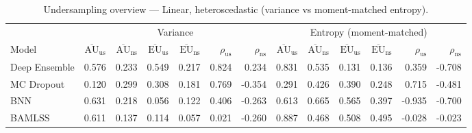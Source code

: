 
\begin{table}[htbp]
\centering
\small
\caption{Undersampling overview --- Linear, heteroscedastic (variance vs moment-matched entropy).}
\begin{tabular}{l*{12}{r}}
\toprule
 & \multicolumn{6}{c}{Variance} & \multicolumn{6}{c}{Entropy (moment-matched)} \\
\cmidrule(lr){2-7}\cmidrule(lr){8-13}
Model & $\overline{\mathrm{AU}}_{\mathrm{us}}$ & $\overline{\mathrm{AU}}_{\mathrm{ns}}$ & $\overline{\mathrm{EU}}_{\mathrm{us}}$ & $\overline{\mathrm{EU}}_{\mathrm{ns}}$ & $\rho_{\mathrm{us}}$ & $\rho_{\mathrm{ns}}$ & $\overline{\mathrm{AU}}_{\mathrm{us}}$ & $\overline{\mathrm{AU}}_{\mathrm{ns}}$ & $\overline{\mathrm{EU}}_{\mathrm{us}}$ & $\overline{\mathrm{EU}}_{\mathrm{ns}}$ & $\rho_{\mathrm{us}}$ & $\rho_{\mathrm{ns}}$ \\
\midrule
Deep Ensemble & 0.576 & 0.233 & 0.549 & 0.217 & 0.824 & 0.234 & 0.831 & 0.535 & 0.131 & 0.136 & 0.359 & -0.708 \\
MC Dropout & 0.120 & 0.299 & 0.308 & 0.181 & 0.769 & -0.354 & 0.291 & 0.426 & 0.390 & 0.248 & 0.715 & -0.481 \\
BNN & 0.631 & 0.218 & 0.056 & 0.122 & 0.406 & -0.263 & 0.613 & 0.665 & 0.565 & 0.397 & -0.935 & -0.700 \\
BAMLSS & 0.611 & 0.137 & 0.114 & 0.057 & 0.021 & -0.260 & 0.887 & 0.468 & 0.508 & 0.495 & -0.028 & -0.023 \\
\bottomrule
\end{tabular}
\end{table}



